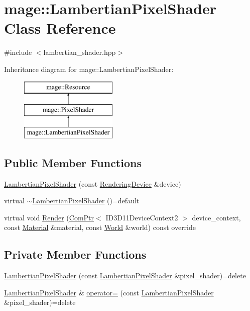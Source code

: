 \hypertarget{classmage_1_1_lambertian_pixel_shader}{}\section{mage\+:\+:Lambertian\+Pixel\+Shader Class Reference}
\label{classmage_1_1_lambertian_pixel_shader}


{\ttfamily \#include $<$lambertian\+\_\+shader.\+hpp$>$}

Inheritance diagram for mage\+:\+:Lambertian\+Pixel\+Shader\+:\begin{figure}[H]
\begin{center}
\leavevmode
\includegraphics[height=3.000000cm]{classmage_1_1_lambertian_pixel_shader}
\end{center}
\end{figure}
\subsection*{Public Member Functions}
\begin{DoxyCompactItemize}
\item 
\hyperlink{classmage_1_1_lambertian_pixel_shader_ad473bfad8be0f47f6d8a9993ef4754de}{Lambertian\+Pixel\+Shader} (const \hyperlink{classmage_1_1_rendering_device}{Rendering\+Device} \&device)
\item 
virtual \hyperlink{classmage_1_1_lambertian_pixel_shader_aedea7342ae95c6532a086fb28978b5b0}{$\sim$\+Lambertian\+Pixel\+Shader} ()=default
\item 
virtual void \hyperlink{classmage_1_1_lambertian_pixel_shader_a9fc8db84f2cd8f6e5722e7436e72e407}{Render} (\hyperlink{namespacemage_ae74f374780900893caa5555d1031fd79}{Com\+Ptr}$<$ I\+D3\+D11\+Device\+Context2 $>$ device\+\_\+context, const \hyperlink{structmage_1_1_material}{Material} \&material, const \hyperlink{classmage_1_1_world}{World} \&world) const override
\end{DoxyCompactItemize}
\subsection*{Private Member Functions}
\begin{DoxyCompactItemize}
\item 
\hyperlink{classmage_1_1_lambertian_pixel_shader_a0e7a36645bb7e1fa9bd481575886ddad}{Lambertian\+Pixel\+Shader} (const \hyperlink{classmage_1_1_lambertian_pixel_shader}{Lambertian\+Pixel\+Shader} \&pixel\+\_\+shader)=delete
\item 
\hyperlink{classmage_1_1_lambertian_pixel_shader}{Lambertian\+Pixel\+Shader} \& \hyperlink{classmage_1_1_lambertian_pixel_shader_a03ae64ef13e62b33c6b6ac306207a045}{operator=} (const \hyperlink{classmage_1_1_lambertian_pixel_shader}{Lambertian\+Pixel\+Shader} \&pixel\+\_\+shader)=delete
\end{DoxyCompactItemize}
